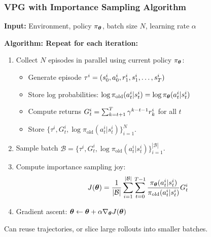 \begin{frame}
\frametitle{VPG with Importance Sampling Algorithm}
\textbf{Input:} Environment, policy $\pi_{{\boldsymbol{\theta}}}$, batch size $N$, learning rate $\alpha$

\textbf{Algorithm: Repeat for each iteration:}
\begin{enumerate}
   
	\item Collect $N$ episodes in parallel using current policy $\pi_{{\boldsymbol{\theta}}}$:
	\begin{itemize}
		\item Generate episode $\tau^i = (s_0^i, a_0^i, r_1^i, s_1^i, \ldots, s_T^i)$
		\item Store log probabilities: $\log \pi_{\text{old}}(a_t^i | s_t^i) = \log \pi_{{\boldsymbol{\theta}}}(a_t^i | s_t^i)$
		\item Compute returns $G_t^i = \sum_{k=t+1}^T \gamma^{k-t-1} r_k^i$ for all $t$
		\item Store $\{\tau^i, G_t^i, \log \pi_{\text{old}}(a_t^i | s_t^i)\}_{i=1}^{N}$.
	\end{itemize}
	\item Sample batch $\mathcal{B} = \{\tau^i, G_t^i, \log \pi_{\text{old}}(a_t^i | s_t^i)\}_{i=1}^{|\mathcal{B}|}$.
	\item Compute importance sampling joy:
	$$
		J({\boldsymbol{\theta}}) = \frac{1}{|\mathcal{B}|} \sum_{i=1}^{|\mathcal{B}|} \sum_{t=0}^{T-1} 
		\frac{\pi_{\boldsymbol{\theta}}(a_t^i | s_t^i)}{\pi_{\text{old}}(a_t^i | s_t^i)} G_t^i
		$$
	\item Gradient ascent: ${\boldsymbol{\theta}} \leftarrow {\boldsymbol{\theta}} + \alpha \nabla_{\boldsymbol{\theta}} J({\boldsymbol{\theta}})$
\end{enumerate}

\vspace{0.2cm}
Can reuse trajectories, or slice large rollouts into smaller batches.
\end{frame}




